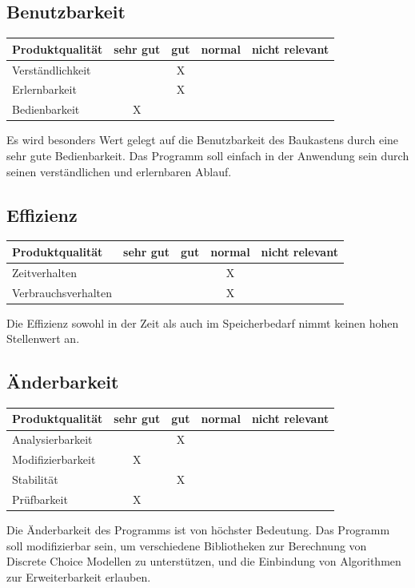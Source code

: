 \documentclass{article}
\begin{document}
\subsection{Benutzbarkeit}
\begin{table}[H]
\centering
\begin{tabular}{lcccc}
\hline
\textbf{Produktqualität} & sehr gut & gut & normal & nicht relevant \\ \hline
Verständlichkeit         &          & X   &        &                \\
Erlernbarkeit            &          & X   &        &                \\
Bedienbarkeit            & X        &     &        &                \\
\end{tabular}
\end{table}
Es wird besonders Wert gelegt auf die Benutzbarkeit des Baukastens durch eine sehr gute Bedienbarkeit. Das Programm soll einfach in der Anwendung sein durch seinen verständlichen und erlernbaren Ablauf.

\subsection{Effizienz}
\begin{table}[H]
\centering
\begin{tabular}{lcccc}
\hline
\textbf{Produktqualität} & sehr gut & gut & normal & nicht relevant \\ \hline
Zeitverhalten            &          &     & X      &                \\
Verbrauchsverhalten      &          &     & X      &               
\end{tabular}
\end{table}
Die Effizienz sowohl in der Zeit als auch im Speicherbedarf nimmt keinen hohen Stellenwert an. 

\subsection{Änderbarkeit}
\begin{table}[H]
\centering
\begin{tabular}{lcccc}
\hline
\textbf{Produktqualität} & sehr gut & gut & normal & nicht relevant \\ \hline
Analysierbarkeit         &          & X   &        &                \\
Modifizierbarkeit        & X        &     &        &                \\
Stabilität               &          & X   &        &                \\
Prüfbarkeit              & X        &     &        &                \\
\end{tabular}
\end{table}
Die Änderbarkeit des Programms ist von höchster Bedeutung. Das Programm soll modifizierbar sein, um verschiedene Bibliotheken zur Berechnung von Discrete Choice Modellen zu unterstützen, und die Einbindung von Algorithmen zur Erweiterbarkeit erlauben.

\newpage
\printglossaries
\end{document}
